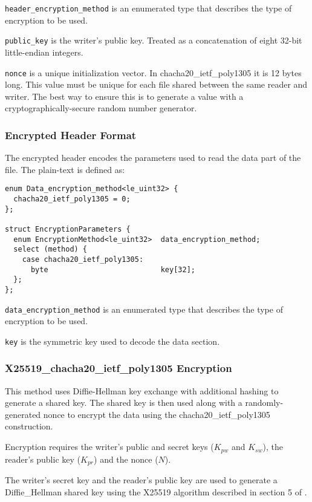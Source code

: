 \documentclass[10pt]{article}
\newcommand{\kw}[1]{\texttt{#1}}
\begin{document}
\kw{header\_encryption\_method} is an enumerated type that describes the type of encryption to be used.

\kw{public\_key} is the writer's public key.
Treated as a concatenation of eight 32-bit little-endian integers.

\kw{nonce} is a unique initialization vector.
In chacha20\_ietf\_poly1305 it is 12 bytes long.
This value must be unique for each file shared between the same reader and writer.
The best way to ensure this is to generate a value with a cryptographically-secure random number generator.

\subsubsection{Encrypted Header Format}

The encrypted header encodes the parameters used to read the data part of the file.
The plain-text is defined as:

\begin{verbatim}
enum Data_encryption_method<le_uint32> {
  chacha20_ietf_poly1305 = 0;
};

struct EncryptionParameters {
  enum EncryptionMethod<le_uint32>  data_encryption_method;
  select (method) {
    case chacha20_ietf_poly1305:
      byte                          key[32];
  };
};
\end{verbatim}

\kw{data\_encryption\_method} is an enumerated type that describes the type of encryption to be used.

\kw{key} is the symmetric key used to decode the data section.

\subsubsection{X25519\_chacha20\_ietf\_poly1305 Encryption}

This method uses Diffie-Hellman key exchange with additional hashing to generate a shared key.
The shared key is then used along with a randomly-generated nonce to encrypt the data using the chacha20\_ietf\_poly1305
construction.

Encryption requires the writer's public and secret keys ($K_{pw}$ and $K_{sw}$), the reader's public key ($K_{pr}$)
and the nonce ($N$).

The writer's secret key and the reader's public key are used to generate a Diffie\_Hellman shared key using the
X25519 algorithm described in section 5 of \cite{RFC7748}.
\end{document}
